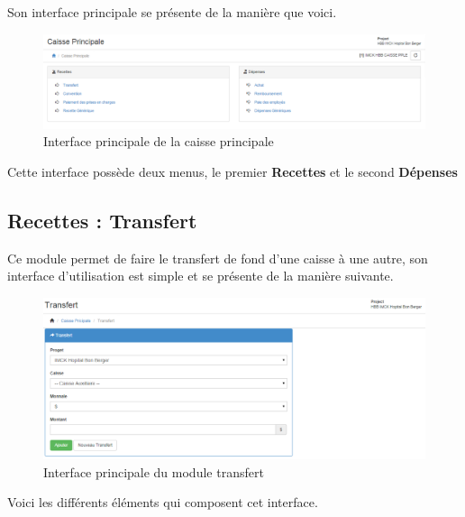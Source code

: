 \documentclass[12pt,a4paper]{report}
\begin{document}
Son interface principale se présente de la manière que voici.

\begin{figure}[h]
\begin{center}
\includegraphics[width=14cm]{pic/caissePrincipale.png}
\end{center}
\caption{Interface principale de la caisse principale}
\label{Interface principale de la caisse principale}
\end{figure}

Cette interface possède deux menus, le premier \textbf{Recettes} et le second \textbf{Dépenses}

\subsection{Recettes : Transfert}
Ce module permet de faire le transfert de fond d'une caisse à une autre, son interface d'utilisation est simple et se présente de la manière suivante.

\begin{figure}[h]
\begin{center}
\includegraphics[width=14cm]{pic/Transfert.png}
\end{center}
\caption{Interface principale du module transfert}
\label{Interface principale du module transfert}
\end{figure}

Voici les différents éléments qui composent cet interface.
\end{document}
